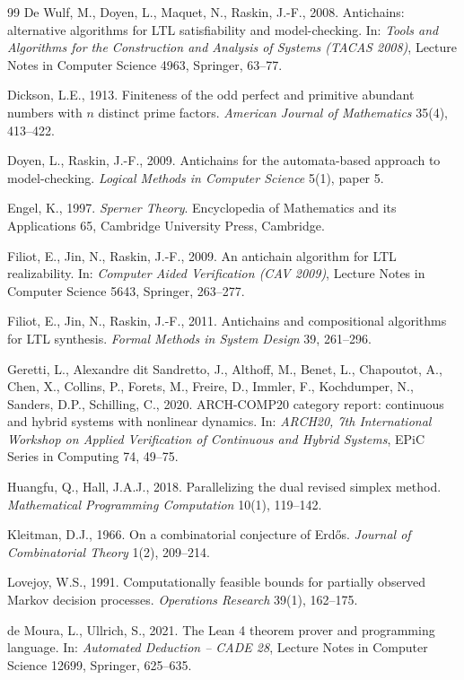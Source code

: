 \begin{thebibliography}{99}
 De Wulf, M., Doyen, L., Maquet, N., Raskin, J.-F., 2008. Antichains: alternative algorithms for LTL satisfiability and model-checking. In: \emph{Tools and Algorithms for the Construction and Analysis of Systems (TACAS 2008)}, Lecture Notes in Computer Science 4963, Springer, 63--77.

 Dickson, L.E., 1913. Finiteness of the odd perfect and primitive abundant numbers with $n$ distinct prime factors. \emph{American Journal of Mathematics} 35(4), 413--422.

 Doyen, L., Raskin, J.-F., 2009. Antichains for the automata-based approach to model-checking. \emph{Logical Methods in Computer Science} 5(1), paper 5.

 Engel, K., 1997. \emph{Sperner Theory}. Encyclopedia of Mathematics and its Applications 65, Cambridge University Press, Cambridge.

 Filiot, E., Jin, N., Raskin, J.-F., 2009. An antichain algorithm for LTL realizability. In: \emph{Computer Aided Verification (CAV 2009)}, Lecture Notes in Computer Science 5643, Springer, 263--277.

 Filiot, E., Jin, N., Raskin, J.-F., 2011. Antichains and compositional algorithms for LTL synthesis. \emph{Formal Methods in System Design} 39, 261--296.

 Geretti, L., Alexandre dit Sandretto, J., Althoff, M., Benet, L., Chapoutot, A., Chen, X., Collins, P., Forets, M., Freire, D., Immler, F., Kochdumper, N., Sanders, D.P., Schilling, C., 2020. ARCH-COMP20 category report: continuous and hybrid systems with nonlinear dynamics. In: \emph{ARCH20, 7th International Workshop on Applied Verification of Continuous and Hybrid Systems}, EPiC Series in Computing 74, 49--75.

 Huangfu, Q., Hall, J.A.J., 2018. Parallelizing the dual revised simplex method. \emph{Mathematical Programming Computation} 10(1), 119--142.

 Kleitman, D.J., 1966. On a combinatorial conjecture of Erd\H{o}s. \emph{Journal of Combinatorial Theory} 1(2), 209--214.

 Lovejoy, W.S., 1991. Computationally feasible bounds for partially observed Markov decision processes. \emph{Operations Research} 39(1), 162--175.

 de Moura, L., Ullrich, S., 2021. The Lean 4 theorem prover and programming language. In: \emph{Automated Deduction -- CADE 28}, Lecture Notes in Computer Science 12699, Springer, 625--635.


\end{thebibliography}

